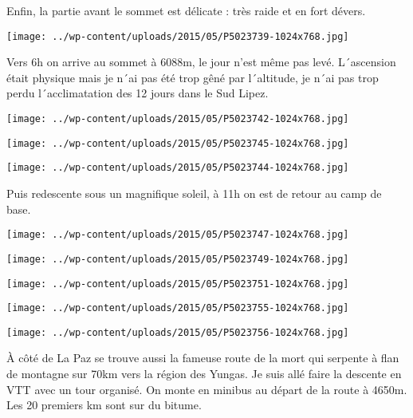  Enfin, la partie avant le sommet est délicate : très raide et en fort dévers. \newline
 \newline
\centerline{\texttt{[image: ../wp-content/uploads/2015/05/P5023739-1024x768.jpg]} } 
 \newline
 Vers 6h on arrive au sommet à 6088m, le jour n'est même pas levé. L´ascension était physique mais je n´ai pas été trop gêné par l´altitude, je n´ai pas trop perdu l´acclimatation des 12 jours dans le Sud Lipez. \newline
 \newline
\centerline{\texttt{[image: ../wp-content/uploads/2015/05/P5023742-1024x768.jpg]} } 
 \newline
 \newline
\centerline{\texttt{[image: ../wp-content/uploads/2015/05/P5023745-1024x768.jpg]} } 
 \newline
 \newline
\centerline{\texttt{[image: ../wp-content/uploads/2015/05/P5023744-1024x768.jpg]} } 
 \newline
 Puis redescente sous un magnifique soleil, à 11h on est de retour au camp de base. \newline
 \newline
\centerline{\texttt{[image: ../wp-content/uploads/2015/05/P5023747-1024x768.jpg]} } 
 \newline
 \newline
\centerline{\texttt{[image: ../wp-content/uploads/2015/05/P5023749-1024x768.jpg]} } 
 \newline
 \newline
\centerline{\texttt{[image: ../wp-content/uploads/2015/05/P5023751-1024x768.jpg]} } 
 \newline
 \newline
\centerline{\texttt{[image: ../wp-content/uploads/2015/05/P5023755-1024x768.jpg]} } 
 \newline
 \newline
\centerline{\texttt{[image: ../wp-content/uploads/2015/05/P5023756-1024x768.jpg]} } 
 \newline
 À côté de La Paz se trouve aussi la fameuse route de la mort qui serpente à flan de montagne sur 70km vers la région des Yungas. \newline
 Je suis allé faire la descente en VTT avec un tour organisé. On monte en minibus au départ de la route à 4650m. Les 20 premiers km sont sur du bitume. \newline
